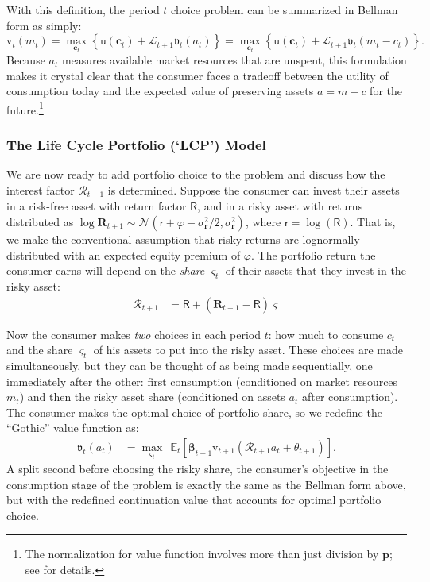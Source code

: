 \documentclass{article}
\newcommand{\uFunc}{\mathrm{u}}
\newcommand{\cLvl}{\mathbf{c}}
\newcommand{\Rport}{\mathcal{R}}
\newcommand{\pLvl}{\mathbf{p}}
\newcommand{\vFunc}{\mathrm{v}}
\newcommand{\Alive}{\mathcal{L}}
\newcommand{\Ex}{\mathbb{E}}
\newcommand{\cNrm}{c}
\newcommand{\aNrm}{a}
\newcommand{\mNrm}{m}
\newcommand{\Rfree}{\mathsf{R}}
\newcommand{\rfree}{\mathsf{r}}
\newcommand{\eprem}{\varphi}
\newcommand{\Risky}{\mathbf{R}}
\newcommand{\risky}{\mathbf{r}}
\begin{document}
With this definition, the period $t$ choice problem can be summarized in Bellman form as simply:
\begin{equation}
\vFunc_t(\mNrm_t) = \max_{\cLvl_t} \left\{ \uFunc(\cLvl_{t}) + \Alive_{t+1} \mathfrak{v}_{t}(\aNrm_{t}) \right\} = \max_{\cLvl_t} \left\{ \uFunc(\cLvl_{t}) + \Alive_{t+1} \mathfrak{v}_{t}(\mNrm_{t} - \cNrm_t) \right\}.
\end{equation}
Because $\aNrm_t$ measures available market resources that are unspent, this formulation makes it crystal clear that the consumer faces a tradeoff between the utility of consumption today and the expected value of preserving assets $\aNrm=\mNrm -\cNrm$ for the future.\footnote{The normalization for value function involves more than just division by $\pLvl$; see \cite{BufferStockTheory} for details.}

\subsubsection{The Life Cycle Portfolio (`LCP') Model}\label{lcp-model}

We are now ready to add portfolio choice to the problem and discuss how the interest factor $\Rport_{t+1}$ is determined.
Suppose the consumer can invest their assets in a risk-free asset with return factor $\Rfree$, and in a risky asset with returns distributed as $\log \Risky_{t+1} \sim \mathcal{N}(\rfree + \eprem - \sigma^{2}_{\risky}/2, \sigma_{\risky}^{2})$, where $\rfree = \log(\Rfree)$.
That is, we make the conventional assumption that risky returns are lognormally distributed with an expected equity premium of $\eprem$.
The portfolio return the consumer earns will depend on the \textit{share} $\varsigma_t$ of their assets that they invest in the risky asset:
\begin{align}
    \Rport_{t+1} & = \Rfree + (\Risky_{t+1}-\Rfree)\varsigma
\end{align}

Now the consumer makes \textit{two} choices in each period $t$: how much to consume $\cNrm_t$ and the share $\varsigma_t$ of his assets to put into the risky asset.
These choices are made simultaneously, but they can be thought of as being made sequentially, one immediately after the other: first consumption (conditioned on market resources $\mNrm_t$) and then the risky asset share (conditioned on assets $\aNrm_t$ after consumption).
The consumer makes the optimal choice of portfolio share, so we redefine the ``Gothic'' value function as:
\begin{align}
\mathfrak{v}_{t}(\aNrm_t) & = \max_{\varsigma_t}~~ \Ex_{t}\left[ \pmb{\beta}_{t+1} \vFunc_{t+1}(\Rport_{t+1} \aNrm_t + \theta_{t+1}) \right].
\end{align}
A split second before choosing the risky share, the consumer's objective in the consumption stage of the problem is exactly the same as the Bellman form above, but with the redefined continuation value that accounts for optimal portfolio choice.
\end{document}
